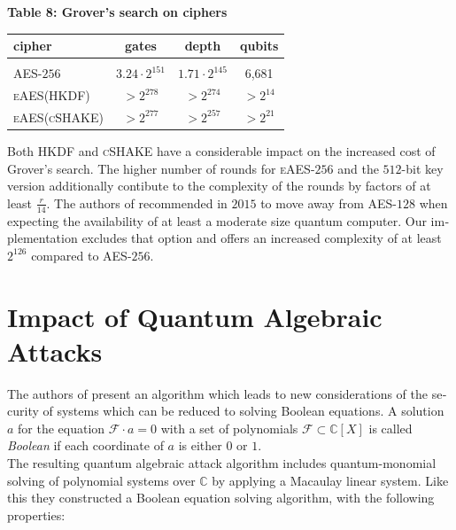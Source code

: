 \documentclass[a4paper,11pt]{article}
\begin{document}
\begin{otherlanguage}{english}
\begin{center}
\textbf{Table 8: Grover's search on ciphers} \\
\vspace{0.2cm}
  \begin{tabular}{l|c|c|c}
  cipher &  gates & depth & qubits \\ 
  \hline
    &  &  & \\ [-8pt]
  \textsc{AES}-$256$ & $3.24 \cdot 2^{151}$  & $1.71 \cdot 2^{145}$  & 6,681 \\
  \small{\textsc{eAES}(\tiny{\textsc{HKDF}})} & $> 2^{278}$ & $ > 2^{274}$ & $>  2^{14}$  \\  
  \small{\textsc{eAES}(\tiny{\textsc{cSHAKE}})} & $> 2^{277}$ & $ > 2^{257}$ & $> 2^{21}$  \\  
  \end{tabular} 
\end{center}
\vspace{0.5cm} 

\noindent
Both \textsc{HKDF} and \textsc{cSHAKE} have a considerable impact on the increased cost of Grover's search. The higher number of rounds for \textsc{eAES}-$256$ and the $512$-bit key version additionally contibute to the complexity of the rounds by factors of at least $\frac{r}{14}$. The authors of \cite{GRO} recommended in $2015$ to move away from \textsc{AES}-$128$ when expecting the availability of at least a moderate size quantum computer. Our implementation excludes that option and offers an increased complexity of at least $2^{126}$ compared to \textsc{AES}-$256$. \\

\section{Impact of Quantum Algebraic Attacks}

\noindent
The authors of \cite{QAA} present an algorithm which leads to new considerations of the security of systems which can be reduced to solving Boolean equations. A solution $a$ for the equation $\mathcal{F} \cdot a = 0$ with a set of polynomials $\mathcal{F} \subset \mathbb{C}[X]$ is called \textit{Boolean} if each coordinate of $a$ is either $0$ or $1$.\\

\noindent
The resulting quantum algebraic attack algorithm includes quantum-monomial solving of polynomial systems over $\mathbb{C}$ by applying a Macaulay linear system. Like this they constructed a Boolean equation solving algorithm, with the following properties: \\


\end{otherlanguage}
\end{document}
